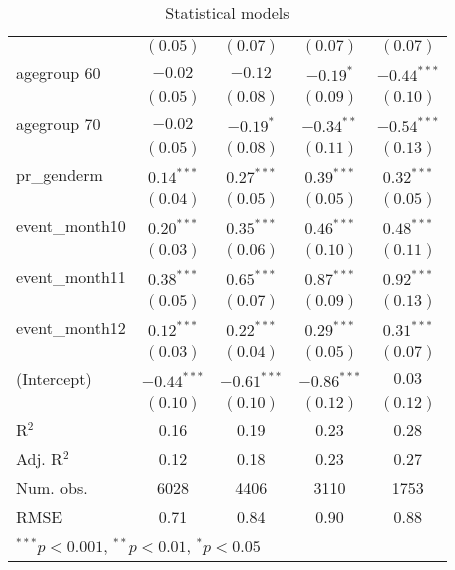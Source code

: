 \begin{table}
\begin{center}
\begin{tabular}{l c c c c }
                   & $(0.05)$      & $(0.07)$      & $(0.07)$      & $(0.07)$      \\
agegroup 60        & $-0.02$       & $-0.12$       & $-0.19^{*}$   & $-0.44^{***}$ \\
                   & $(0.05)$      & $(0.08)$      & $(0.09)$      & $(0.10)$      \\
agegroup 70        & $-0.02$       & $-0.19^{*}$   & $-0.34^{**}$  & $-0.54^{***}$ \\
                   & $(0.05)$      & $(0.08)$      & $(0.11)$      & $(0.13)$      \\
pr\_genderm        & $0.14^{***}$  & $0.27^{***}$  & $0.39^{***}$  & $0.32^{***}$  \\
                   & $(0.04)$      & $(0.05)$      & $(0.05)$      & $(0.05)$      \\
event\_month10     & $0.20^{***}$  & $0.35^{***}$  & $0.46^{***}$  & $0.48^{***}$  \\
                   & $(0.03)$      & $(0.06)$      & $(0.10)$      & $(0.11)$      \\
event\_month11     & $0.38^{***}$  & $0.65^{***}$  & $0.87^{***}$  & $0.92^{***}$  \\
                   & $(0.05)$      & $(0.07)$      & $(0.09)$      & $(0.13)$      \\
event\_month12     & $0.12^{***}$  & $0.22^{***}$  & $0.29^{***}$  & $0.31^{***}$  \\
                   & $(0.03)$      & $(0.04)$      & $(0.05)$      & $(0.07)$      \\
(Intercept)        & $-0.44^{***}$ & $-0.61^{***}$ & $-0.86^{***}$ & $0.03$        \\
                   & $(0.10)$      & $(0.10)$      & $(0.12)$      & $(0.12)$      \\
\hline
R$^2$              & 0.16          & 0.19          & 0.23          & 0.28          \\
Adj. R$^2$         & 0.12          & 0.18          & 0.23          & 0.27          \\
Num. obs.          & 6028          & 4406          & 3110          & 1753          \\
RMSE               & 0.71          & 0.84          & 0.90          & 0.88          \\
\hline
\multicolumn{5}{l}{\scriptsize{$^{***}p<0.001$, $^{**}p<0.01$, $^*p<0.05$}}
\end{tabular}
\caption{Statistical models}
\label{table:coefficients}
\end{center}
\end{table}
